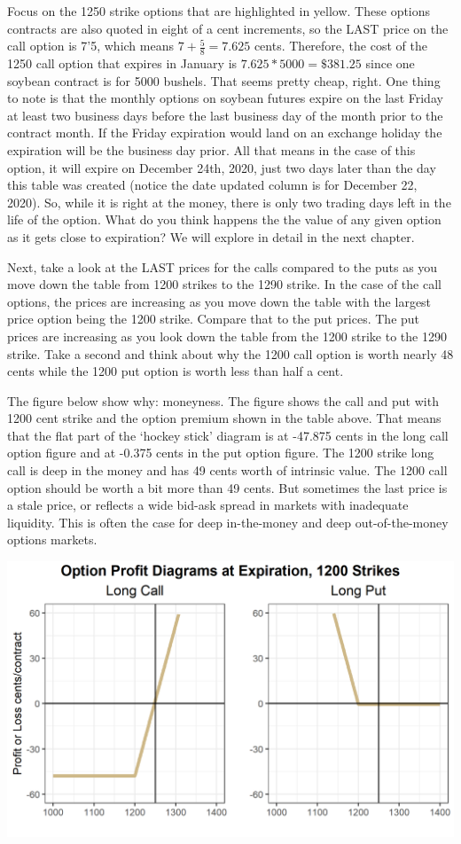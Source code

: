 \documentclass[
  letterpaper,
  DIV=11,
  numbers=noendperiod]{scrreprt}
\begin{document}
Focus on the 1250 strike options that are highlighted in yellow. These
options contracts are also quoted in eight of a cent increments, so the
LAST price on the call option is 7'5, which means
\(7 + \frac{5}{8} = 7.625\) cents. Therefore, the cost of the 1250 call
option that expires in January is \(7.625*5000 = \$381.25\) since one
soybean contract is for 5000 bushels. That seems pretty cheap, right.
One thing to note is that the monthly options on soybean futures expire
on the last Friday at least two business days before the last business
day of the month prior to the contract month. If the Friday expiration
would land on an exchange holiday the expiration will be the business
day prior. All that means in the case of this option, it will expire on
December 24th, 2020, just two days later than the day this table was
created (notice the date updated column is for December 22, 2020). So,
while it is right at the money, there is only two trading days left in
the life of the option. What do you think happens the the value of any
given option as it gets close to expiration? We will explore in detail
in the next chapter.

Next, take a look at the LAST prices for the calls compared to the puts
as you move down the table from 1200 strikes to the 1290 strike. In the
case of the call options, the prices are increasing as you move down the
table with the largest price option being the 1200 strike. Compare that
to the put prices. The put prices are increasing as you look down the
table from the 1200 strike to the 1290 strike. Take a second and think
about why the 1200 call option is worth nearly 48 cents while the 1200
put option is worth less than half a cent.

The figure below show why: moneyness. The figure shows the call and put
with 1200 cent strike and the option premium shown in the table above.
That means that the flat part of the `hockey stick' diagram is at
-47.875 cents in the long call option figure and at -0.375 cents in the
put option figure. The 1200 strike long call is deep in the money and
has 49 cents worth of intrinsic value. The 1200 call option should be
worth a bit more than 49 cents. But sometimes the last price is a stale
price, or reflects a wide bid-ask spread in markets with inadequate
liquidity. This is often the case for deep in-the-money and deep
out-of-the-money options markets.

\includegraphics{assets/Options1-optionmoneynessplot.png}
\end{document}
